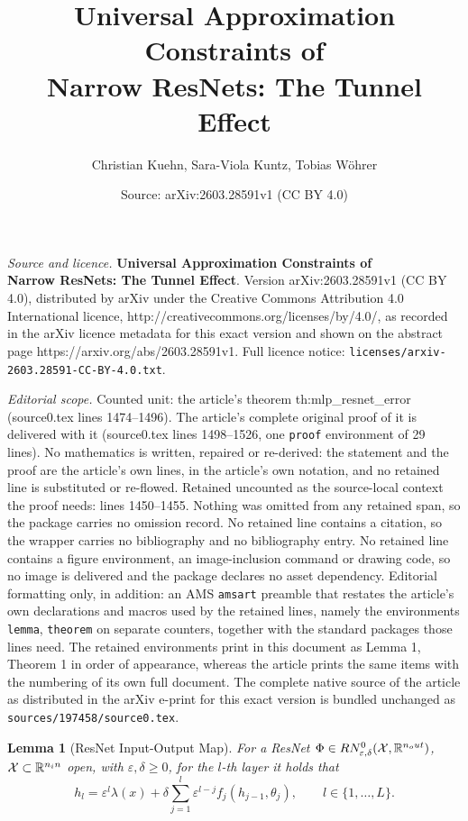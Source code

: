 \documentclass[10pt,a4paper]{amsart}
\title{\textbf{Universal Approximation Constraints of \\ Narrow ResNets: The Tunnel Effect}}
\author{Christian Kuehn, Sara-Viola Kuntz, Tobias W\"ohrer}
\date{Source: arXiv:2603.28591v1 (CC BY 4.0)}
\newtheorem{lemma}{Lemma}
\newcommand{\R}{\mathbb{R}}
\newcommand{\eps}{\varepsilon}
\newcommand*{\nin}{n_\textup{in}}
\newcommand*{\nout}{n_\textup{out}}
\begin{document}
\maketitle

\noindent\emph{Source and licence.} \textbf{Universal Approximation Constraints of \\ Narrow ResNets: The Tunnel Effect}. Version arXiv:2603.28591v1 (CC BY 4.0), distributed by arXiv under the Creative Commons Attribution 4.0 International licence, http://creativecommons.org/licenses/by/4.0/, as recorded in the arXiv licence metadata for this exact version and shown on the abstract page https://arxiv.org/abs/2603.28591v1. Full licence notice: \texttt{licenses/arxiv-2603.28591-CC-BY-4.0.txt}.\par\smallskip

\noindent\textit{Editorial scope.} Counted unit: the article's theorem th:mlp\_resnet\_error (source0.tex lines 1474--1496). The article's complete original proof of it is delivered with it (source0.tex lines 1498--1526, one \texttt{proof} environment of 29 lines). No mathematics is written, repaired or re-derived: the statement and the proof are the article's own lines, in the article's own notation, and no retained line is substituted or re-flowed.  Retained uncounted as the source-local context the proof needs: lines 1450--1455.  Nothing was omitted from any retained span, so the package carries no omission record.  No retained line contains a citation, so the wrapper carries no bibliography and no bibliography entry.  No retained line contains a figure environment, an image-inclusion command or drawing code, so no image is delivered and the package declares no asset dependency.  Editorial formatting only, in addition: an AMS \texttt{amsart} preamble that restates the article's own declarations and macros used by the retained lines, namely the environments \texttt{lemma}, \texttt{theorem} on separate counters, together with the standard packages those lines need.  The retained environments print in this document as Lemma 1, Theorem 1 in order of appearance, whereas the article prints the same items with the numbering of its own full document.  The complete native source of the article as distributed in the arXiv e-print for this exact version is bundled unchanged as \texttt{sources/197458/source0.tex}.
\begin{lemma}[ResNet Input-Output Map]\label{lem:resnet_inputoutput}
	For a ResNet $\Phi \in \textup{RN}^0_{\eps,\delta}(\mathcal{X},\R^{\nout})$, $\mathcal{X}\subset \R^{\nin}$ open, with $\eps,\delta \geq 0$, for the $l$-th layer it holds that
    \begin{equation}\label{eq:inputoutput}
        h_l = \eps^l \lambda(x) + \delta \sum_{j = 1}^{l} \eps^{l-j}f_j(h_{j-1},\theta_j), \qquad l \in \{1,\ldots,L\}.
    \end{equation}
\end{lemma}
\end{document}
